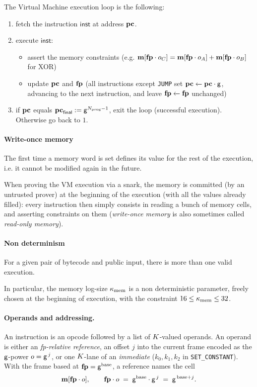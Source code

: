 The Virtual Machine execution loop is the following:
\begin{enumerate}
  \item fetch the instruction $\mathsf{inst}$ at address $\mathbf{pc}$.
  \item execute $\mathsf{inst}$:
    \begin{itemize}
      \item assert the memory constraints (e.g. $\mathbf{m}[\mathbf{fp}\cdot o_C]=\mathbf{m}[\mathbf{fp}\cdot o_A]+\mathbf{m}[\mathbf{fp}\cdot o_B]$ for XOR)
      \item update $\mathbf{pc}$ and $\mathbf{fp}$ (all instructions except \texttt{JUMP} set $\mathbf{pc} \xleftarrow{} \mathbf{pc} \cdot \mathsf{g}$, advancing to the next instruction, and leave $\mathbf{fp} \xleftarrow{} \mathbf{fp}$ unchanged)
    \end{itemize}
  \item if $\mathbf{pc}$ equals $\mathbf{pc}_{\textsf{final}} := \mathsf{g}^{N_{\mathrm{prog}} - 1}$, exit the loop (successful execution). Otherwise go back to $1.$
\end{enumerate}

\paragraph{Write-once memory}

The first time a memory word is set defines its value for the rest of the execution, i.e. it cannot be modified again in the future.

When proving the VM execution via a snark, the memory is committed (by an untrusted prover) at the beginning of the execution (with all the values already filled): every instruction then simply consists in reading a bunch of memory cells, and asserting constraints on them (\textit{write-once memory} is also sometimes called \textit{read-only memory}).

\paragraph{Non determinism}

For a given pair of bytecode and public input, there is more than one valid execution.

In particular, the memory log-size $\kappa_{\mathrm{mem}}$ is a non deterministic parameter, freely chosen at the beginning of execution, with the constraint $16\le\kappa_{\mathrm{mem}}\le 32$.

\paragraph{Operands and addressing.} An instruction is an opcode followed by a list of $K$-valued operands. An operand is either an \emph{fp-relative reference}, an offset $j$ into the current frame encoded as the $\mathsf{g}$-power $o=\mathsf{g}^{\,j}$, or one $K$-lane of an \emph{immediate} ($k_0,k_1,k_2$ in \texttt{SET\_CONSTANT}). With the frame based at $\mathbf{fp}=\mathsf{g}^{\mathrm{base}}$, a reference names the cell
\[
  \mathbf{m}[\mathbf{fp}\cdot o],\qquad \mathbf{fp}\cdot o\;=\;\mathsf{g}^{\mathrm{base}}\cdot\mathsf{g}^{\,j}\;=\;\mathsf{g}^{\,\mathrm{base}+j}.
\]

